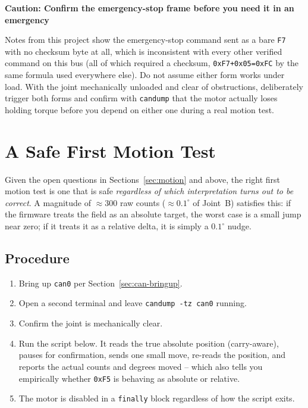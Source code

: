 \documentclass[11pt,letterpaper]{article}
\newenvironment{caution}[1]{%
    \par\addvspace{8pt}%
    \noindent{\color{cautionred}\rule{\linewidth}{0.8pt}}\par\vspace{2pt}
    \noindent\textbf{\color{cautionred}Caution: #1}\par\vspace{2pt}
}{%
    \par\vspace{2pt}\noindent{\color{cautionred}\rule{\linewidth}{0.4pt}}%
    \par\addvspace{8pt}%
}
\begin{document}
\begin{caution}{Confirm the emergency-stop frame before you need it in an emergency}
Notes from this project show the emergency-stop command sent as a bare \texttt{F7} with no checksum byte at all, which is inconsistent with every other verified command on this bus (all of which required a checksum, \texttt{0xF7+0x05=0xFC} by the same formula used everywhere else). Do not assume either form works under load. With the joint mechanically unloaded and clear of obstructions, deliberately trigger both forms and confirm with \texttt{candump} that the motor actually loses holding torque before you depend on either one during a real motion test.
\end{caution}

\newpage
\section{A Safe First Motion Test}
\label{sec:safe-test}

Given the open questions in Sections~\ref{sec:motion} and above, the right first motion test is one that is safe \emph{regardless of which interpretation turns out to be correct}. A magnitude of $\approx 300$ raw counts ($\approx 0.1^\circ$ of Joint~B) satisfies this: if the firmware treats the field as an absolute target, the worst case is a small jump near zero; if it treats it as a relative delta, it is simply a $0.1^\circ$ nudge.

\subsection{Procedure}
\begin{enumerate}
    \item Bring up \texttt{can0} per Section~\ref{sec:can-bringup}.
    \item Open a second terminal and leave \texttt{candump -tz can0} running.
    \item Confirm the joint is mechanically clear.
    \item Run the script below. It reads the true absolute position (carry-aware), pauses for confirmation, sends one small move, re-reads the position, and reports the actual counts and degrees moved -- which also tells you empirically whether \texttt{0xF5} is behaving as absolute or relative.
    \item The motor is disabled in a \texttt{finally} block regardless of how the script exits.
\end{enumerate}
\end{document}
